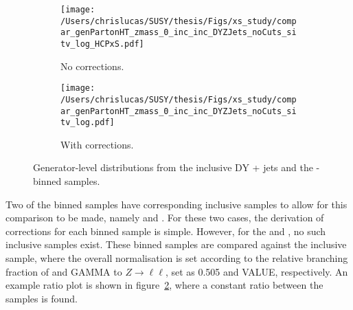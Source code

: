 \begin{figure}[b!]
  \centering
  \begin{subfigure}[b]{0.45\textwidth}
    \texttt{[image: /Users/chrislucas/SUSY/thesis/Figs/xs\_study/compar\_genPartonHT\_zmass\_0\_inc\_inc\_DYZJets\_noCuts\_sitv\_log\_HCPxS.pdf]}
    \caption{No corrections.}
    \label{fig:xsec_study_before}
  \end{subfigure}             
  \begin{subfigure}[b]{0.45\textwidth}
    \texttt{[image: /Users/chrislucas/SUSY/thesis/Figs/xs\_study/compar\_genPartonHT\_zmass\_0\_inc\_inc\_DYZJets\_noCuts\_sitv\_log.pdf]}
    \caption{With corrections.}
    \label{fig:xsec_study_after}
  \end{subfigure}             
  \caption{Generator-level \HTpart distributions from the
    inclusive DY + jets and the \HTpart-binned \zj
    samples.}
  \label{fig:xsec_study}
\end{figure}

Two of the binned samples have corresponding inclusive samples to allow for 
this comparison to be made, namely \wj and \dyj. For these two cases, the 
derivation of corrections for each \HTpart binned sample is simple. However, for
the \zj and \gj, no such inclusive samples exist. These binned samples are 
compared against the inclusive \dyj sample, where the overall normalisation is 
set according to the relative branching fraction of \zinv and GAMMA to
$Z \to \ell\ell$, set as 0.505 and VALUE, respectively. An example ratio plot is
shown in figure~\ref{fig:xsec_study_after}, where a constant ratio between the 
samples is found.

